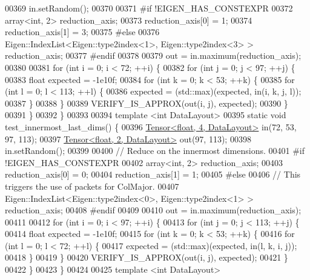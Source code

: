 \begin{DoxyCode}
00369   in.setRandom();
00370 
00371 \textcolor{preprocessor}{#if !EIGEN\_HAS\_CONSTEXPR }
00372   array<int, 2> reduction\_axis;
00373   reduction\_axis[0] = 1;
00374   reduction\_axis[1] = 3;
00375 \textcolor{preprocessor}{#else}
00376   Eigen::IndexList<Eigen::type2index<1>, Eigen::type2index<3> > reduction\_axis;
00377 \textcolor{preprocessor}{#endif}
00378 
00379   out = in.maximum(reduction\_axis);
00380 
00381   \textcolor{keywordflow}{for} (\textcolor{keywordtype}{int} i = 0; i < 72; ++i) \{
00382     \textcolor{keywordflow}{for} (\textcolor{keywordtype}{int} j = 0; j < 97; ++j) \{
00383       \textcolor{keywordtype}{float} expected = -1e10f;
00384       \textcolor{keywordflow}{for} (\textcolor{keywordtype}{int} k = 0; k < 53; ++k) \{
00385         \textcolor{keywordflow}{for} (\textcolor{keywordtype}{int} l = 0; l < 113; ++l) \{
00386           expected = (std::max)(expected, in(i, k, j, l));
00387         \}
00388       \}
00389       VERIFY\_IS\_APPROX(out(i, j), expected);
00390     \}
00391   \}
00392 \}
00393 
00394 \textcolor{keyword}{template} <\textcolor{keywordtype}{int} DataLayout>
00395 \textcolor{keyword}{static} \textcolor{keywordtype}{void} test\_innermost\_last\_dims() \{
00396   \hyperlink{class_eigen_1_1_tensor}{Tensor<float, 4, DataLayout>} in(72, 53, 97, 113);
00397   \hyperlink{class_eigen_1_1_tensor}{Tensor<float, 2, DataLayout>} out(97, 113);
00398   in.setRandom();
00399 
00400 \textcolor{comment}{// Reduce on the innermost dimensions.}
00401 \textcolor{preprocessor}{#if !EIGEN\_HAS\_CONSTEXPR}
00402   array<int, 2> reduction\_axis;
00403   reduction\_axis[0] = 0;
00404   reduction\_axis[1] = 1;
00405 \textcolor{preprocessor}{#else}
00406   \textcolor{comment}{// This triggers the use of packets for ColMajor.}
00407   Eigen::IndexList<Eigen::type2index<0>, Eigen::type2index<1> > reduction\_axis;
00408 \textcolor{preprocessor}{#endif}
00409 
00410   out = in.maximum(reduction\_axis);
00411 
00412   \textcolor{keywordflow}{for} (\textcolor{keywordtype}{int} i = 0; i < 97; ++i) \{
00413     \textcolor{keywordflow}{for} (\textcolor{keywordtype}{int} j = 0; j < 113; ++j) \{
00414       \textcolor{keywordtype}{float} expected = -1e10f;
00415       \textcolor{keywordflow}{for} (\textcolor{keywordtype}{int} k = 0; k < 53; ++k) \{
00416         \textcolor{keywordflow}{for} (\textcolor{keywordtype}{int} l = 0; l < 72; ++l) \{
00417           expected = (std::max)(expected, in(l, k, i, j));
00418         \}
00419       \}
00420       VERIFY\_IS\_APPROX(out(i, j), expected);
00421     \}
00422   \}
00423 \}
00424 
00425 \textcolor{keyword}{template} <\textcolor{keywordtype}{int} DataLayout>

\end{DoxyCode}
